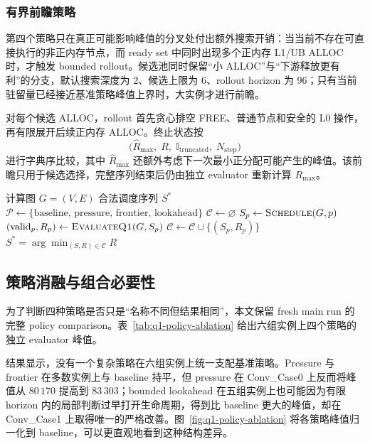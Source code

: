 \subsubsection{有界前瞻策略}

第四个策略只在真正可能影响峰值的分叉处付出额外搜索开销：当当前不存在可直接执行的非正内存节点，而 ready set 中同时出现多个正内存 L1/UB ALLOC 时，才触发 bounded rollout。候选池同时保留“小 ALLOC”与“下游释放更有利”的分支，默认搜索深度为 2、候选上限为 6、rollout horizon 为 96；只有当前驻留量已经接近基准策略峰值上界时，大实例才进行前瞻。

对每个候选 ALLOC，rollout 首先贪心排空 FREE、普通节点和安全的 L0 操作，再有限展开后续正内存 ALLOC。终止状态按
\[
\bigl(\widehat R_{\max},\;R,\;\mathbb I_{\mathrm{truncated}},\;N_{\mathrm{step}}\bigr)
\]
进行字典序比较，其中 $\widehat R_{\max}$ 还额外考虑下一次最小正分配可能产生的峰值。该前瞻只用于候选选择，完整序列结束后仍由独立 evaluator 重新计算 $R_{\max}$。

\begin{algorithm}[H]
\caption{问题一四策略组合与结果晋升}
\label{alg:q1-portfolio}
\begin{algorithmic}[1]
\Require 计算图 $G=(V,E)$
\Ensure 合法调度序列 $S^*$
\State $\mathcal P\gets\{\text{baseline, pressure, frontier, lookahead}\}$
\State $\mathcal C\gets\varnothing$
    \State $S_p\gets\textsc{Schedule}(G,p)$
    \State $(\text{valid}_p,R_p)\gets\textsc{EvaluateQ1}(G,S_p)$
        \State $\mathcal C\gets\mathcal C\cup\{(S_p,R_p)\}$
    \EndIf
\EndFor
\State \Return $S^*=\arg\min_{(S,R)\in\mathcal C}R$
\end{algorithmic}
\end{algorithm}

\subsection{策略消融与组合必要性}

为了判断四种策略是否只是“名称不同但结果相同”，本文保留 fresh main run 的完整 policy comparison。表~\ref{tab:q1-policy-ablation} 给出六组实例上四个策略的独立 evaluator 峰值。

\begin{table}[H]
    \centering
    \caption{问题一四策略的峰值驻留量消融}
    \label{tab:q1-policy-ablation}
    \resizebox{\textwidth}{!}{}
\end{table}

结果显示，没有一个复杂策略在六组实例上统一支配基准策略。Pressure 与 frontier 在多数实例上与 baseline 持平，但 pressure 在 Conv\_Case0 上反而将峰值从 $80\,170$ 提高到 $83\,303$；bounded lookahead 在五组实例上也可能因为有限 horizon 内的局部判断过早打开生命周期，得到比 baseline 更大的峰值，却在 Conv\_Case1 上取得唯一的严格改善。图~\ref{fig:q1-policy-ablation} 将各策略峰值归一化到 baseline，可以更直观地看到这种结构差异。

